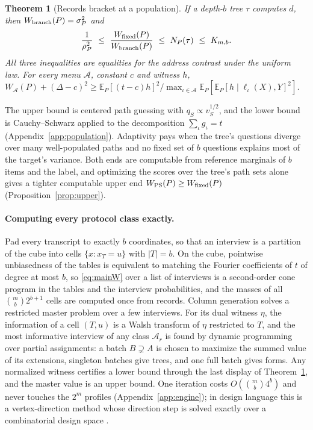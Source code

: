 \documentclass{article}
\newtheorem{theorem}{Theorem}
\newcommand{\E}{\mathbb{E}}
\newcommand{\A}{\mathcal A}
\begin{document}
\begin{theorem}[Records bracket at a population]\label{thm:bracket}
If a depth-$b$ tree $\tau$ computes $d$, then $W_{\rm branch}(P)=\sigma_P^2$ and
\[
 \frac1{\rho_P^2}\ \le\ \frac{W_{\rm fixed}(P)}{W_{\rm branch}(P)}\ \le\ N_P(\tau)\ \le\ K_{m,b}.
\]
All three inequalities are equalities for the address contrast under the uniform law. For every menu $\A$, constant $c$ and witness $h$, $W_\A(P)+(\Delta-c)^2\ge\E_P[(t-c)h]^2/\max_{\iota\in\A}\E_P[\E_P[h\mid\ell_\iota(X),Y]^2]$.
\end{theorem}
The upper bound is centered path guessing with $q_S\propto v_S^{1/2}$, and the lower bound is Cauchy--Schwarz applied to the decomposition $\sum_\iota g_\iota=t$ (Appendix~\ref{app:population}). Adaptivity pays when the tree's questions diverge over many well-populated paths and no fixed set of $b$ questions explains most of the target's variance. Both ends are computable from reference marginals of $b$ items and the label, and optimizing the scores over the tree's path sets alone gives a tighter computable upper end $W_{\rm PS}(P)\ge W_{\rm fixed}(P)$ (Proposition~\ref{prop:upper}).

\paragraph{Computing every protocol class exactly.}
Pad every transcript to exactly $b$ coordinates, so that an interview is a partition of the cube into cells $\{x:x_T=u\}$ with $|T|=b$. On the cube, pointwise unbiasedness of the tables is equivalent to matching the Fourier coefficients of $t$ of degree at most $b$, so \eqref{eq:mainW} over a list of interviews is a second-order cone program in the tables and the interview probabilities, and the masses of all $\binom mb2^{b+1}$ cells are computed once from records. Column generation solves a restricted master problem over a few interviews. For its dual witness $\eta$, the information of a cell $(T,u)$ is a Walsh transform of $\eta$ restricted to $T$, and the most informative interview of any class $\A_r$ is found by dynamic programming over partial assignments: a batch $B\supsetneq A$ is chosen to maximize the summed value of its extensions, singleton batches give trees, and one full batch gives forms. Any normalized witness certifies a lower bound through the last display of Theorem~\ref{thm:bracket}, and the master value is an upper bound. One iteration costs $O(\binom mb4^b)$ and never touches the $2^m$ profiles (Appendix~\ref{app:engine}); in design language this is a vertex-direction method whose direction step is solved exactly over a combinatorial design space \citep{fedorov1972,wynn1970}.
\end{document}
